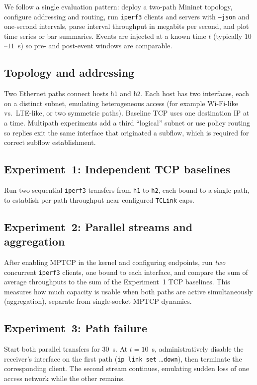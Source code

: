 \label{sec:proposed_architecture}

We follow a single evaluation pattern: deploy a two-path Mininet topology, configure addressing and routing, run \texttt{iperf3} clients and servers with \texttt{--json} and one-second intervals, parse interval throughput in megabits per second, and plot time series or bar summaries. Events are injected at a known time $t$ (typically $10$--$11$~s) so pre- and post-event windows are comparable.

\subsection{Topology and addressing}
Two Ethernet paths connect hosts \texttt{h1} and \texttt{h2}. Each host has two interfaces, each on a distinct subnet, emulating heterogeneous access (for example Wi-Fi-like vs.\ LTE-like, or two symmetric paths). Baseline TCP uses one destination IP at a time. Multipath experiments add a third ``logical'' subnet or use policy routing so replies exit the same interface that originated a subflow, which is required for correct subflow establishment.

\subsection{Experiment~1: Independent TCP baselines}
Run two sequential \texttt{iperf3} transfers from \texttt{h1} to \texttt{h2}, each bound to a single path, to establish per-path throughput near configured \texttt{TCLink} caps.

\subsection{Experiment~2: Parallel streams and aggregation}
After enabling MPTCP in the kernel and configuring endpoints, run \emph{two} concurrent \texttt{iperf3} clients, one bound to each interface, and compare the sum of average throughputs to the sum of the Experiment~1 TCP baselines. This measures how much capacity is usable when both paths are active simultaneously (aggregation), separate from single-socket MPTCP dynamics.

\subsection{Experiment~3: Path failure}
Start both parallel transfers for $30$~s. At $t=10$~s, administratively disable the receiver's interface on the first path (\texttt{ip link set} \ldots \texttt{down}), then terminate the corresponding client. The second stream continues, emulating sudden loss of one access network while the other remains.

